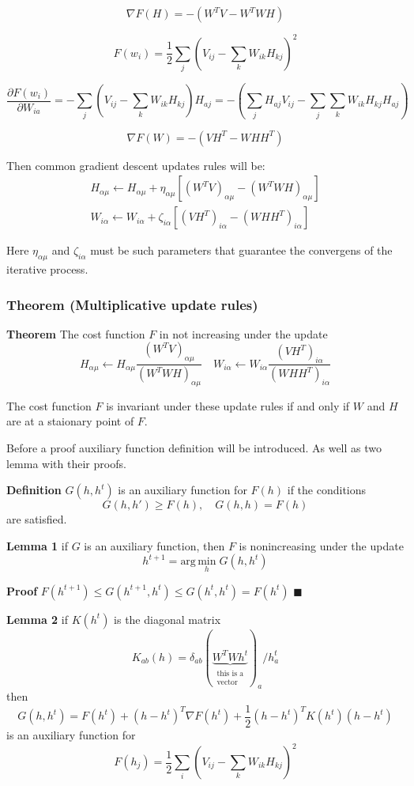 \documentclass{extreport}
\begin{document}
\[
  \nabla F(H) = - ( W^TV - W^TWH )
\]

\[
  F(w_i) = \frac{1}{2}\sum_j
    \left( V_{ij} - \sum_k W_{ik}H_{kj} \right)^2
\]

\[
  \frac{\partial F(w_i)}{\partial W_{ia}} =
  - \sum_j
    \left(
      V_{ij} - \sum_k W_{ik}H_{kj}
    \right)
  H_{aj} =
  -
    \left(
      \sum_j H_{aj}V_{ij} - \sum_j \sum_k W_{ik}H_{kj}H_{aj}
    \right)
\]

\[
  \nabla F(W) = - ( VH^T - WHH^T )
\]

Then common gradient descent updates rules will be:
\begin{align*}
  H_{\alpha\mu} \leftarrow H_{\alpha\mu} +
  \eta_{\alpha\mu} \left[
     (W^TV)_{\alpha\mu} - (W^TWH)_{\alpha\mu}
  \right] \\
  W_{i\alpha} \leftarrow W_{i\alpha} +
  \zeta_{i\alpha} \left[
    (VH^T)_{i\alpha} - (WHH^T)_{i\alpha}
  \right]
\end{align*}

Here $\eta_{\alpha\mu}$ and $\zeta_{i\alpha}$ must be such parameters
that guarantee the convergens of the iterative process.

\subsubsection{Theorem (Multiplicative update rules)}

\textbf{Theorem} The cost function $F$ in not increasing under
the update
\[
  H_{\alpha\mu} \leftarrow H_{\alpha\mu}
  \frac{(W^TV)_{\alpha\mu}}{(W^TWH)_{\alpha\mu}} \quad
  W_{i\alpha} \leftarrow W_{i\alpha}
  \frac{(VH^T)_{i\alpha}}{(WHH^T)_{i\alpha}}
\]

The cost function $F$ is invariant under these update rules if and only if
$W$ and $H$ are at a staionary point of $F$.

Before a proof auxiliary function definition will be introduced. As well as
two lemma with their proofs.

\textbf{Definition} $G(h,h^t)$ is an auxiliary function for $F(h)$ if the
conditions
\[
  G(h,h') \geqslant F(h), \quad G(h,h) = F(h)
\]
are satisfied.

\textbf{Lemma 1} if $G$ is an auxiliary function,
then $F$ is nonincreasing under the update
\[
  h^{t+1} = \text{arg} \, \underset{h}{\text{min}} \; G(h,h^t)
\]

\textbf{Proof}
$F(h^{t+1}) \leqslant G(h^{t+1},h^t) \leqslant G(h^t,h^t) = F(h^t)$
$\blacksquare$

\textbf{Lemma 2} if $K(h^t)$ is the diagonal matrix
\[
  K_{ab}(h) =
  \delta_{ab}
  (\underbrace{W^T W h^t}
    _{\substack{\text{this is a}\\ \text{vector}}}
  )_a / h_a^t
\]
then
\[
  G(h,h^t) = F(h^t) + (h - h^t)^T \nabla F(h^t)
    + \frac{1}{2} (h - h^t)^T K(h^t) (h - h^t)
\]
is an auxiliary function for
\[
  F(h_j) = \frac{1}{2} \sum_{i}
  \left(
    V_{ij} - \sum_{k}W_{ik}H_{kj}
  \right)^2
\]
\end{document}
